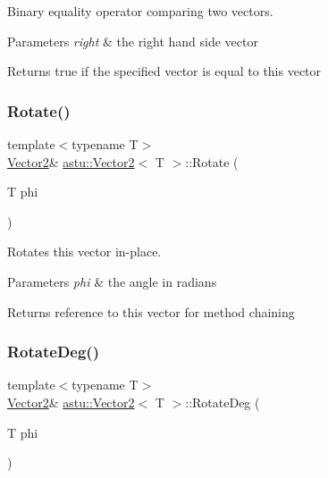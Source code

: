 Binary equality operator comparing two vectors.


\begin{DoxyParams}{Parameters}
{\em right} & the right hand side vector \\
\hline
\end{DoxyParams}
\begin{DoxyReturn}{Returns}
{\ttfamily true} if the specified vector is equal to this vector 
\end{DoxyReturn}
\mbox{\label{classastu_1_1Vector2_ac2b10a554fede91faa5a0668ebe76697}} 
\subsubsection{\texorpdfstring{Rotate()}{Rotate()}}
{\footnotesize\ttfamily template$<$typename T$>$ \\
\hyperlink{classastu_1_1Vector2}{Vector2}\& \hyperlink{classastu_1_1Vector2}{astu\+::\+Vector2}$<$ T $>$\+::Rotate (\begin{DoxyParamCaption}\item[{T}]{phi }\end{DoxyParamCaption})\hspace{0.3cm}{\ttfamily [inline]}}

Rotates this vector in-\/place.


\begin{DoxyParams}{Parameters}
{\em phi} & the angle in radians \\
\hline
\end{DoxyParams}
\begin{DoxyReturn}{Returns}
reference to this vector for method chaining 
\end{DoxyReturn}
\mbox{\label{classastu_1_1Vector2_a85d7593d86a8b74bb3a0a07b3d734ccd}} 
\subsubsection{\texorpdfstring{Rotate\+Deg()}{RotateDeg()}}
{\footnotesize\ttfamily template$<$typename T$>$ \\
\hyperlink{classastu_1_1Vector2}{Vector2}\& \hyperlink{classastu_1_1Vector2}{astu\+::\+Vector2}$<$ T $>$\+::Rotate\+Deg (\begin{DoxyParamCaption}\item[{T}]{phi }\end{DoxyParamCaption})\hspace{0.3cm}{\ttfamily [inline]}}

